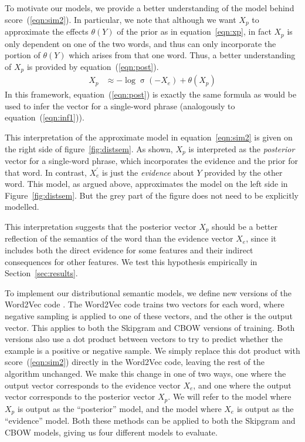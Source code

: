 \documentclass[11pt,a4paper]{article}
\DeclareMathOperator*{\sig}{\sigma}
\begin{document}
To motivate our models, we provide a better understanding of the model behind
score~(\ref{eqn:sim2}).  In particular, we note that although we want $X_p$ to
approximate the effects $\theta(Y)$ of the prior as in equation~\ref{eqn:xp},
in fact $X_p$ is only dependent on one of the two words, and thus can only
incorporate the portion of $\theta(Y)$ which arises from that one word.
Thus, a better understanding of $X_p$ is provided by
equation~(\ref{eqn:post}).
\begin{align}
  X_p
  &\approx  {-}\log\sig({-}X_e) + \theta(X_p) 
  \label{eqn:post}
\end{align}
In this framework, equation~(\ref{eqn:post}) is exactly the same formula as
would be used to infer the vector for a single-word phrase (analogously to
equation~(\ref{eqn:inf1})).

This interpretation of the approximate model in equation~\ref{eqn:sim2} is
given on the right side of figure~\ref{fig:distsem}.  As shown, $X_p$ is
interpreted as the {\em posterior} vector for a single-word phrase, which
incorporates the evidence and the prior for that word.  In contrast,
$X^\prime_e$ is just the {\em evidence} about $Y$ provided by the other word.
This model, as argued above, approximates the model on the left side in
Figure~\ref{fig:distsem}.  But the grey part of the figure does not need to be
explicitly modelled.


This interpretation suggests that the posterior vector $X_p$ should be a better
reflection of the semantics of the word than the evidence vector $X_e$, since
it includes both the direct evidence for some features and their indirect
consequences for other features.  We test this hypothesis empirically in
Section~\ref{sec:results}.




To implement our distributional semantic models, we define new versions of the
Word2Vec code \citep{word2vec1,word2vec2_nips}.  The Word2Vec code trains two
vectors for each word, where negative sampling is applied to one of these
vectors, and the other is the output vector.  This applies to both the
Skipgram and CBOW versions of training.  Both versions also use a dot product
between vectors to try to predict whether the example is a positive or
negative sample.
We simply replace this dot product with score~(\ref{eqn:sim2}) directly in the
Word2Vec code, leaving the rest of the algorithm unchanged.  We make this
change in one of two ways, one where the output vector corresponds to the
evidence vector $X_e$, and one where the output vector corresponds to the
posterior vector $X_p$.
We will refer to the model where $X_p$ is output as the ``posterior'' model,
and the model where $X_e$ is output as the ``evidence'' model.
Both these methods can be applied to both the Skipgram and CBOW models, giving
us four different models to evaluate.
\end{document}
